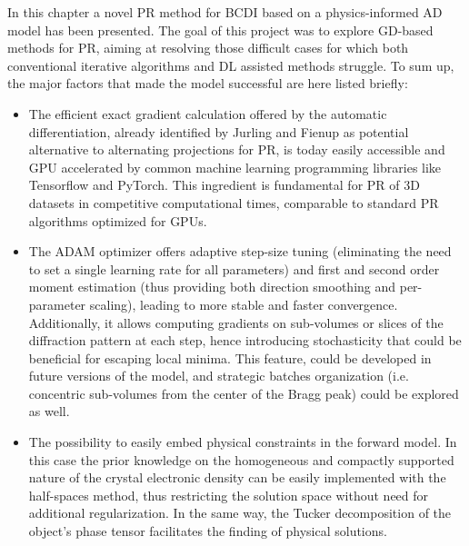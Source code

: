 In this chapter a novel PR method for BCDI based on a physics-informed AD model has been presented. The goal of this 
project was to explore GD-based methods for PR, aiming at resolving those difficult cases for which both conventional 
iterative algorithms and DL assisted methods struggle. To sum up, 
the major factors that made the model successful are here listed briefly: 
\begin{itemize}

  \item The efficient exact gradient calculation offered by the automatic differentiation, already identified by Jurling and 
  Fienup as potential alternative to alternating projections for PR, is today easily accessible and GPU accelerated by common 
  machine learning programming libraries like Tensorflow and PyTorch. This ingredient is fundamental for PR of 3D datasets 
  in competitive computational times, comparable to standard PR algorithms optimized for GPUs. 


  \item The ADAM optimizer offers adaptive step-size tuning (eliminating the need to set a single learning rate for 
  all parameters) and first and second order moment estimation (thus providing both direction smoothing and per-
  parameter scaling), leading to more stable and faster convergence. Additionally, it allows computing gradients on
  sub-volumes or slices of the diffraction pattern at each step, hence introducing stochasticity that could be 
 beneficial for escaping local minima. This feature, could be developed in future versions of the model, and strategic 
 batches organization (i.e. concentric sub-volumes from the center of the Bragg peak) could be explored as well. 


  \item The possibility to easily embed physical constraints in the forward model. In this case the prior knowledge on the 
  homogeneous and compactly supported nature of the crystal electronic density can be easily implemented with the half-spaces 
  method, thus restricting the solution space without need for additional regularization. In the same way, the Tucker 
  decomposition of the object's phase tensor facilitates the finding of physical solutions. 


\end{itemize}

